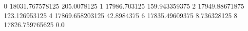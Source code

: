0 18031.767578125 205.0078125
1 17986.703125 159.943359375
2 17949.88671875 123.126953125
4 17869.658203125 42.8984375
6 17835.49609375 8.736328125
8 17826.759765625 0.0
